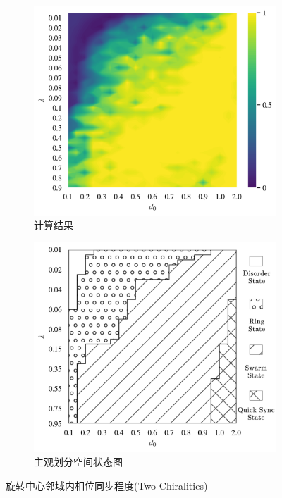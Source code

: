 \documentclass{article}
\begin{document}
\vspace{-0.5cm}
\begin{figure}[H]
	\centering
	\begin{subfigure}[b]{0.49\textwidth}
		\includegraphics[width=\textwidth]{./figs/limitDisPhaseSync.png}
		\vspace{-1cm}
		\caption{计算结果}
	\end{subfigure}
	\begin{subfigure}[b]{0.49\textwidth}
		\includegraphics[width=\textwidth]{./figs/subjectiveOp3.png}
		\vspace{-1cm}
		\caption{主观划分空间状态图}
	\end{subfigure}
	\vspace{-0.5cm}
	\caption{旋转中心邻域内相位同步程度(Two Chiralities)}
	\label{fig:fig234c.5.1}
\end{figure}
\end{document}
